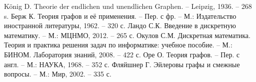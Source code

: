 
\begin{thebibliography}{10}
	 K\"{o}nig D. Theorie der endlichen und unendlichen
	Graphen. – Leipzig, 1936. – 268 s.
	 Берж К. Теория графов и её применения. – Пер. с фр. – 
	М.: Издательство иностранной литературы, 1962. – 320 с.
	 Ландо С.К. Введение в дискретную математику. – М.: 
	МЦНМО, 2012. – 265 с.
	 Окулов С.М. Дискретная математика. Теория и 
	практика решения задач по информатике: учебное пособие. – М.: БИНОМ. 
	Лаборатория знаний, 2008. – 422 с.
	 Оре О. Теория графов. – Пер. с англ. – М.: НАУКА, 1968. 
	– 352 с.
	 Фляйшнер Г. Эйлеровы графы и 
	смежные вопросы. – М.: Мир, 2002. –	335 с.
\end{thebibliography}
